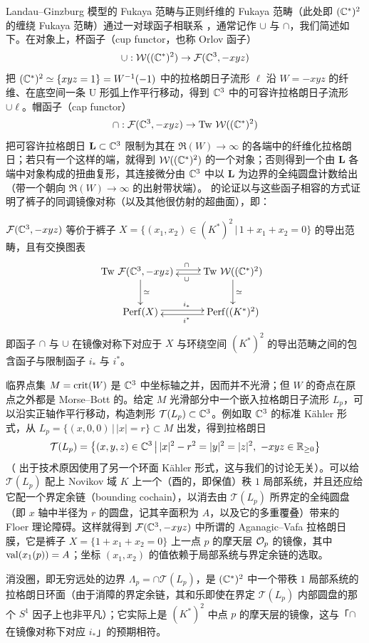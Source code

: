 Landau--Ginzburg 模型的 Fukaya 范畴与正则纤维的 Fukaya 范畴（此处即 $(\mathbb{C}^*)^2$ 的缠绕 Fukaya 范畴）通过一对球函子相联系 \cite{AG,AS}，通常记作 $\cup$ 与 $\cap$，我们简述如下。在对象上，杯函子（cup functor，也称 Orlov 函子）
\[
\cup:\mathcal{W}((\mathbb{C}^*)^2)\to\mathcal{F}(\mathbb{C}^3,-xyz)
\]
把 $(\mathbb{C}^*)^2\simeq\{xyz=1\}=W^{-1}(-1)$ 中的拉格朗日子流形 $\ell$ 沿 $W=-xyz$ 的纤维、在底空间一条 U 形弧上作平行移动，得到 $\mathbb{C}^3$ 中的可容许拉格朗日子流形 $\cup\ell$。帽函子（cap functor）
\[
\cap:\mathcal{F}(\mathbb{C}^3,-xyz)\to\operatorname{Tw}\,\mathcal{W}((\mathbb{C}^*)^2)
\]
把可容许拉格朗日 $\mathbf{L}\subset\mathbb{C}^3$ 限制为其在 $\Re(W)\to\infty$ 的各端中的纤维化拉格朗日；若只有一个这样的端，就得到 $\mathcal{W}((\mathbb{C}^*)^2)$ 的一个对象；否则得到一个由 $\mathbf{L}$ 各端中对象构成的扭曲复形，其连接微分由 $\mathbb{C}^3$ 中以 $\mathbf{L}$ 为边界的全纯圆盘计数给出（带一个朝向 $\Re(W)\to\infty$ 的出射带状端）。\cite{AA} 的论证以与这些函子相容的方式证明了裤子的同调镜像对称（以及其他很仿射的超曲面），即：

\begin{theo}[\cite{AA}]
$\mathcal{F}(\mathbb{C}^3,-xyz)$ 等价于裤子 $X=\{(x_1,x_2)\in(K^*)^2\,|\,1+x_1+x_2=0\}$ 的导出范畴，且有交换图表
\[
\xymatrix{
\!\!\!\!\Tw\,\F(\C^3,-xyz) \ar@<.5ex>[r]^{\cap} \ar[d]^{\simeq}
& \Tw\,\W((\C^*)^2) \ar@<.5ex>[l]^{\cup}\ar[d]^{\simeq} \\
\Perf(X)\ar@<.5ex>[r]^{i_*} & \Perf((K^*)^2) \ar@<.5ex>[l]^{i^*}
}
\]
即函子 $\cap$ 与 $\cup$ 在镜像对称下对应于 $X$ 与环绕空间 $(K^*)^2$ 的导出范畴之间的包含函子与限制函子 $i_*$ 与 $i^*$。
\end{theo}

临界点集 $M=\operatorname{crit}(W)$ 是 $\mathbb{C}^3$ 中坐标轴之并，因而并不光滑；但 $W$ 的奇点在原点之外都是 Morse--Bott 的。给定 $M$ 光滑部分中一个嵌入拉格朗日子流形 $L_p$，可以沿实正轴作平行移动，构造刺形 $\mathcal{T}(L_p)\subset\mathbb{C}^3$。例如取 $\mathbb{C}^3$ 的标准 K\"ahler 形式，从 $L_p=\{(x,0,0)\,|\,|x|=r\}\subset M$ 出发，得到拉格朗日
\[
\mathcal{T}(L_p)=\bigl\{(x,y,z)\in\C^3\,\big|\,|x|^2-r^2=|y|^2=|z|^2,\ -xyz\in\R_{\ge 0}\bigr\}
\]
（\cite{AA} 出于技术原因使用了另一个环面 K\"ahler 形式，这与我们的讨论无关）。可以给 $\mathcal{T}(L_p)$ 配上 Novikov 域 $K$ 上一个（酉的，即保值）秩 $1$ 局部系统，并且还应给它配一个界定余链（bounding cochain），以消去由 $\mathcal{T}(L_p)$ 所界定的全纯圆盘（即 $x$ 轴中半径为 $r$ 的圆盘，记其辛面积为 $A$，以及它的多重覆叠）带来的 Floer 理论障碍。这样就得到 $\mathcal{F}(\mathbb{C}^3,-xyz)$ 中所谓的 Aganagic--Vafa 拉格朗日膜，它是裤子 $X=\{1+x_1+x_2=0\}$ 上一点 $p$ 的摩天层 $\mathcal{O}_p$ 的镜像，其中 $\operatorname{val}(x_1(p))=A$；坐标 $(x_1,x_2)$ 的值依赖于局部系统与界定余链的选取。

消没圈，即无穷远处的边界 $\Lambda_p=\cap\mathcal{T}(L_p)$，是 $(\mathbb{C}^*)^2$ 中一个带秩 $1$ 局部系统的拉格朗日环面（由于消障的界定余链，其和乐即使在界定 $\mathcal{T}(L_p)$ 内部圆盘的那个 $S^1$ 因子上也非平凡）；它实际上是 $(K^*)^2$ 中点 $p$ 的摩天层的镜像，这与「$\cap$ 在镜像对称下对应 $i_*$」的预期相符。

